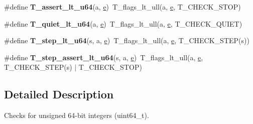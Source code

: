 \begin{DoxyCompactItemize}
\item 
\mbox{\label{group__RTEMSTestFrameworkChecksUInt64_ga805c130ce3d1e83cc1d775d2acb6a002}} 
\#define {\bfseries T\+\_\+assert\+\_\+lt\+\_\+u64}(a,  \mbox{\hyperlink{sun4u_2tte_8h_a8b0b9ed08e0e18920ec2682f48228c27}{e}})~T\+\_\+flags\+\_\+lt\+\_\+ull(a, \mbox{\hyperlink{sun4u_2tte_8h_a8b0b9ed08e0e18920ec2682f48228c27}{e}}, T\+\_\+\+C\+H\+E\+C\+K\+\_\+\+S\+T\+OP)
\item 
\mbox{\label{group__RTEMSTestFrameworkChecksUInt64_ga465051b836321bdbab935f4d3099f35a}} 
\#define {\bfseries T\+\_\+quiet\+\_\+lt\+\_\+u64}(a,  \mbox{\hyperlink{sun4u_2tte_8h_a8b0b9ed08e0e18920ec2682f48228c27}{e}})~T\+\_\+flags\+\_\+lt\+\_\+ull(a, \mbox{\hyperlink{sun4u_2tte_8h_a8b0b9ed08e0e18920ec2682f48228c27}{e}}, T\+\_\+\+C\+H\+E\+C\+K\+\_\+\+Q\+U\+I\+ET)
\item 
\mbox{\label{group__RTEMSTestFrameworkChecksUInt64_ga3b8323bbc95c86aad08f08d60cafeb2e}} 
\#define {\bfseries T\+\_\+step\+\_\+lt\+\_\+u64}(s,  a,  \mbox{\hyperlink{sun4u_2tte_8h_a8b0b9ed08e0e18920ec2682f48228c27}{e}})~T\+\_\+flags\+\_\+lt\+\_\+ull(a, \mbox{\hyperlink{sun4u_2tte_8h_a8b0b9ed08e0e18920ec2682f48228c27}{e}}, T\+\_\+\+C\+H\+E\+C\+K\+\_\+\+S\+T\+EP(s))
\item 
\mbox{\label{group__RTEMSTestFrameworkChecksUInt64_gaabd80b1a5aa6c1b09125fb7a208aaf31}} 
\#define {\bfseries T\+\_\+step\+\_\+assert\+\_\+lt\+\_\+u64}(s,  a,  \mbox{\hyperlink{sun4u_2tte_8h_a8b0b9ed08e0e18920ec2682f48228c27}{e}})~T\+\_\+flags\+\_\+lt\+\_\+ull(a, \mbox{\hyperlink{sun4u_2tte_8h_a8b0b9ed08e0e18920ec2682f48228c27}{e}}, T\+\_\+\+C\+H\+E\+C\+K\+\_\+\+S\+T\+EP(s) $\vert$ T\+\_\+\+C\+H\+E\+C\+K\+\_\+\+S\+T\+OP)
\end{DoxyCompactItemize}


\subsection{Detailed Description}
Checks for unsigned 64-\/bit integers (uint64\+\_\+t). 

